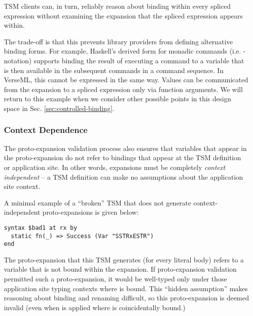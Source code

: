 TSM clients can, in turn, reliably reason about binding within every spliced expression without examining the expansion that the spliced expression appears within.

The trade-off is that this prevents library providers from defining  alternative binding forms. For example, Haskell's derived form for monadic commands (i.e. -notation) supports binding the result of executing a command to a variable that is then available in the subsequent commands in a command sequence. In VerseML, this cannot be expressed in the same way. Values can be communicated from the expansion to a spliced expression only via function arguments. 
We will return to this example when we consider other possible points in this design space in Sec. \ref{sec:controlled-binding}.


\subsubsection{Context Dependence}
The proto-expansion validation process also ensures that variables that appear in the proto-expansion do not refer to bindings that appear at the TSM definition or application site. In other words, expansions must be completely \emph{context independent} -- a TSM definition can make no assumptions about the application site context.

A minimal example of a ``broken'' TSM that does not generate context-independent proto-expansions is given below:
\begin{lstlisting}[numbers=none]
syntax $bad1 at rx by
  static fn(_) => Success (Var "SSTRxESTR")
end
\end{lstlisting}
The proto-expansion that this TSM generates (for every literal body) refers to a variable  that is not bound within the expansion. If proto-expansion validation permitted such a proto-expansion, it would be well-typed only under those application site typing contexts where  is bound. This ``hidden assumption'' makes reasoning about binding and renaming difficult, so this proto-expansion is deemed invalid (even when  is applied where  is coincidentally bound.)

